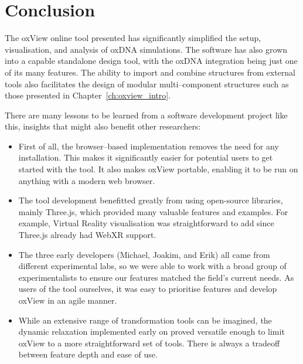 \section{Conclusion}

The oxView online tool presented has significantly simplified the setup, visualisation, and analysis of oxDNA simulations. The software has also grown into a capable standalone design tool, with the oxDNA integration being just one of its many features. The ability to import and combine structures from external tools also facilitates the design of modular multi--component structures such as those presented in Chapter~\ref{ch:oxview_intro}.

There are many lessons to be learned from a software development project like this, insights that might also benefit other researchers:
\begin{itemize}
\item First of all, the browser--based implementation removes the need for any installation. This makes it significantly easier for potential users to get started with the tool. It also makes oxView portable, enabling it to be run on anything with a modern web browser.
\item The tool development benefitted greatly from using open-source libraries, mainly Three.js, which provided many valuable features and examples. For example, Virtual Reality visualisation was straightforward to add since Three.js already had WebXR support.
\item The three early developers (Michael, Joakim, and Erik) all came from different experimental labs, so we were able to work with a broad group of experimentalists to ensure our features matched the field's current needs. As users of the tool ourselves, it was easy to prioritise features and develop oxView in an agile manner.
\item While an extensive range of transformation tools can be imagined, the dynamic relaxation implemented early on proved versatile enough to limit oxView to a more straightforward set of tools. There is always a tradeoff between feature depth and ease of use.

\end{itemize}
